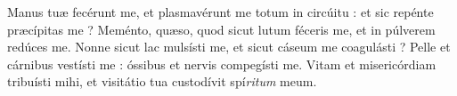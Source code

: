 \lettrine{M}{}anus tuæ fecérunt me, et plasmavérunt me totum in circúitu : et sic repénte præcípitas me ?
Meménto, quæso, quod sicut lutum féceris me, et in púlverem redúces me.
Nonne sicut lac mulsísti me, et sicut cáseum me coagulásti ?
Pelle et cárnibus vestísti me : óssibus et nervis compegísti me.
Vitam et misericórdiam tribuísti mihi, et visitátio tua custodívit spí\textit{ritum} meum.